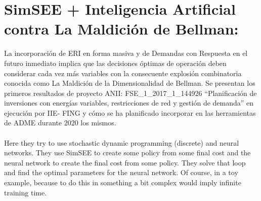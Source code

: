 \documentclass[12pt]{article}
\theoremstyle{definition}
\theoremstyle{remark}
\begin{document}
\section*{SimSEE + Inteligencia Artificial contra La Maldici\'on de Bellman:}
La incorporación de ERI en forma masiva y de Demandas con Respuesta en el futuro inmediato implica que las decisiones \'optimas de operaci\'on deben considerar cada vez m\'as variables con la consecuente explosi\'on combinatoria conocida como La Maldici\'on de la Dimensionalidad de Bellman. Se presentan los primeros resultados de proyecto ANII: FSE\_1\_2017\_1\_144926 “Planificación de inversiones con energ\'ias variables, restricciones de red y gesti\'on de demanda” en ejecuci\'on por IIE- FING y c\'omo se ha planificado incorporar en las herramientas de ADME durante 2020 los mismos.\\
\quad\\
{\color{blue} Here they try to use stochastic dynamic programming (discrete) and neural networks. They use SimSEE to create some policy from some final cost and the neural network to create the final cost from some policy. They solve that loop and find the optimal parameters for the neural network. Of course, in a toy example, because to do this in something a bit complex would imply infinite training time.}
\end{document}
